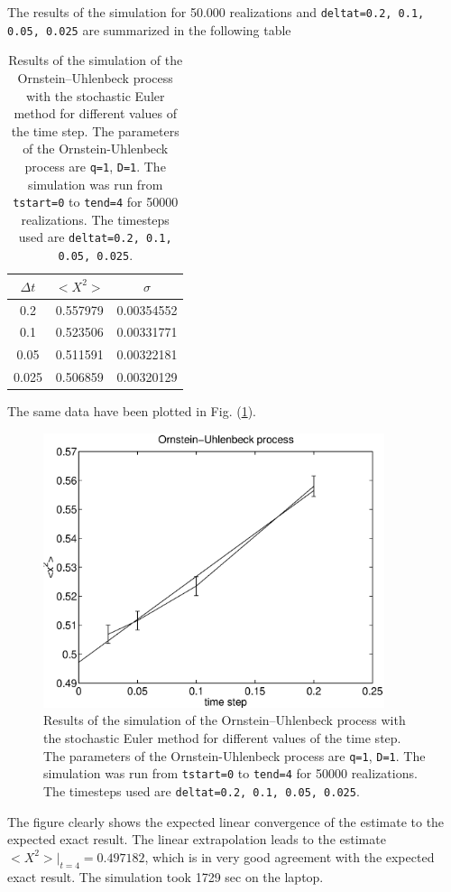 The results of the simulation for 50.000 realizations 
and \texttt{deltat=0.2, 0.1, 0.05, 0.025} are summarized in the following 
table 
\begin{table}
\caption{Results of the simulation of the Ornstein--Uhlenbeck 
process with the stochastic Euler method for different values of 
the time step. The parameters of the Ornstein-Uhlenbeck process
are \texttt{q=1}, \texttt{D=1}. The simulation was run from
\texttt{tstart=0} to \texttt{tend=4} for 50000 realizations.
The timesteps used are \texttt{deltat=0.2, 0.1, 0.05, 0.025}.}
\begin{center}
\begin{tabular}{|c|c|c|} \hline \hline
$\Delta t$ & $<X^2>$ & $\sigma$ \\ \hline \hline
0.2      & 0.557979 & 0.00354552 \\ \hline
0.1      & 0.523506 & 0.00331771  \\ \hline
0.05     & 0.511591 & 0.00322181  \\ \hline
0.025    & 0.506859 & 0.00320129  \\ \hline \hline
\end{tabular}
\end{center}
\end{table}
The same data have been plotted in Fig. (\ref{F_SDEORN_50}).
\begin{figure}
\label{F_SDEORN_50}
\includegraphics[width=10cm]{./Figures/f_sdeorn_50.eps}
\caption{Results of the simulation of the Ornstein--Uhlenbeck 
process with the stochastic Euler method for different values of 
the time step. The parameters of the Ornstein-Uhlenbeck process
are \texttt{q=1}, \texttt{D=1}. The simulation was run from
\texttt{tstart=0} to \texttt{tend=4} for 50000 realizations.
The timesteps used are \texttt{deltat=0.2, 0.1, 0.05, 0.025}.} 
\end{figure}
The figure clearly shows the expected linear convergence of the 
estimate to the expected exact result. The linear extrapolation 
leads to the estimate $<X^2>|_{t=4}=0.497182$, which is in very 
good agreement with the expected exact result. The simulation took
1729 sec on the laptop.

